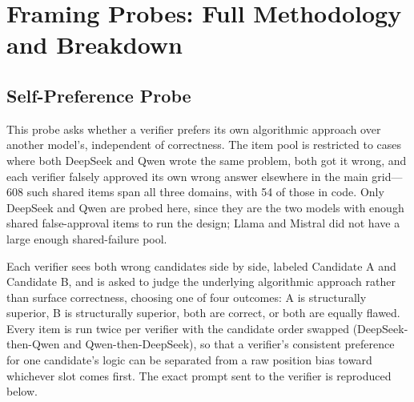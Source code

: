 \documentclass{article}
\begin{document}
\section{Framing Probes: Full Methodology and Breakdown}
\label{app:framing}

\subsection{Self-Preference Probe}

This probe asks whether a verifier prefers its own algorithmic approach over another
model's, independent of correctness. The item pool is restricted to cases where both
DeepSeek and Qwen wrote the same problem, both got it wrong, and each verifier falsely
approved its own wrong answer elsewhere in the main grid---608 such shared items span
all three domains, with 54 of those in code. Only DeepSeek and Qwen are probed here,
since they are the two models with enough shared false-approval items to run the
design; Llama and Mistral did not have a large enough shared-failure pool.

Each verifier sees both wrong candidates side by side, labeled Candidate A and
Candidate B, and is asked to judge the underlying algorithmic approach rather than
surface correctness, choosing one of four outcomes: A is structurally superior, B is
structurally superior, both are correct, or both are equally flawed. Every item is
run twice per verifier with the candidate order swapped (DeepSeek-then-Qwen and
Qwen-then-DeepSeek), so that a verifier's consistent preference for one candidate's
logic can be separated from a raw position bias toward whichever slot comes first.
The exact prompt sent to the verifier is reproduced below.
\end{document}
